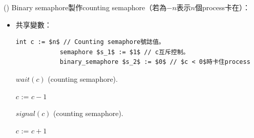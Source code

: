 \begin{theorem}{()} Binary semaphore製作counting semaphore（若為$-n$表示$n$個process卡在）：\begin{itemize}
        \item 共享變數：\begin{lstlisting}[caption={Shared variables of The dining-philosophers problem.}, captionpos=b, mathescape=true]
            int c := $n$ // Counting semaphore號誌值。
            semaphore $s_1$ := $1$ // c互斥控制。
            binary_semaphore $s_2$ := $0$ // $c < 0$時卡住process
        \end{lstlisting}
        \begin{algorithm}[H]
            \caption{$wait(c)$ (counting semaphore).}
            \begin{algorithmic}[1]
                    \State {}
                    \State $c$ := $c - 1$
                        \State {}
                        \State {} 
                    \Else
                        \State {}
                    \EndIf
                \EndFunction
            \end{algorithmic}
        \end{algorithm}
        \begin{algorithm}[H]
            \caption{$signal(c)$ (counting semaphore).}
            \begin{algorithmic}[1]
                    \State {}
                    \State $c$ := $c + 1$
                     
                        \State {}
                    \EndIf
                    \State {}
                \EndFunction
            \end{algorithmic}
        \end{algorithm}
    \end{itemize}
\end{theorem}

